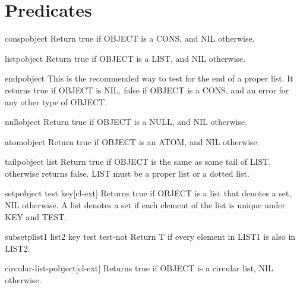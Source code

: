 \documentclass[10pt,english]{book}
\begin{document}
\section{Predicates}
\label{sec:list-predicates}

\begin{function}{consp}{object}
  Return true if OBJECT is a CONS, and NIL otherwise.
\end{function}

\begin{function}{listp}{object}
  Return true if OBJECT is a LIST, and NIL otherwise.
\end{function}

\begin{function}{endp}{object}
  This is the recommended way to test for the end of a proper list. It
  returns true if OBJECT is NIL, false if OBJECT is a CONS, and an error
  for any other type of OBJECT.
\end{function}

\begin{function}{null}{object}
  Return true if OBJECT is a NULL, and NIL otherwise.
\end{function}

\begin{function}{atom}{object}
  Return true if OBJECT is an ATOM, and NIL otherwise.
\end{function}

\begin{function}{tailp}{object list}
  Return true if OBJECT is the same as some tail of LIST, otherwise
   returns false. LIST must be a proper list or a dotted list.
\end{function}

\begin{function}{setp}{object \key test key}[cl-ext]
  Returns true if OBJECT is a list that denotes a set, NIL otherwise. A list
denotes a set if each element of the list is unique under KEY and TEST.
\end{function}

\begin{function}{subsetp}{list1 list2 \key key test test-not}
  Return T if every element in LIST1 is also in LIST2.
\end{function}

\begin{function}{circular-list-p}{object}[cl-ext]
  Returns true if OBJECT is a circular list, NIL otherwise.
\end{function}
\end{document}

